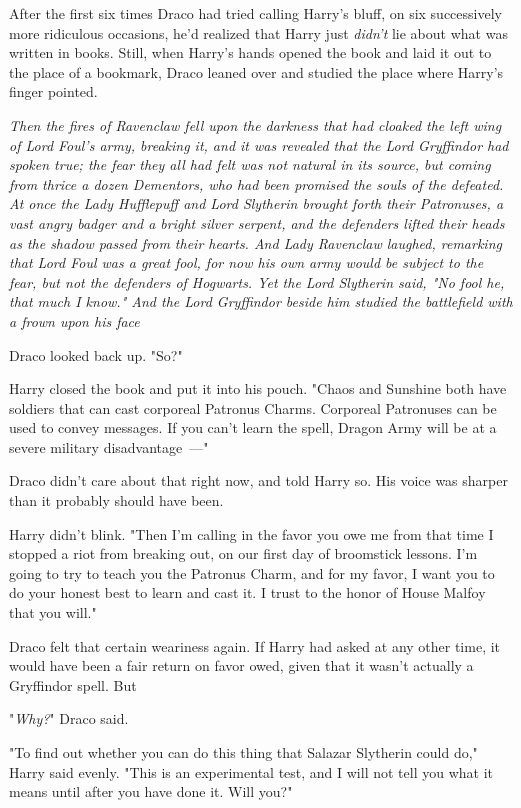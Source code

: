 After the first six times Draco had tried calling Harry's bluff, on six
successively more ridiculous occasions, he'd realized that Harry just
\emph{didn't} lie about what was written in books. Still, when Harry's hands
opened the book and laid it out to the place of a bookmark, Draco leaned over
and studied the place where Harry's finger pointed.

\emph{Then the fires of Ravenclaw fell upon the darkness that had cloaked the
left wing of Lord Foul's army, breaking it, and it was revealed that the Lord
Gryffindor had spoken true; the fear they all had felt was not natural in its
source, but coming from thrice a dozen Dementors, who had been promised the
souls of the defeated. At once the Lady Hufflepuff and Lord Slytherin brought
forth their Patronuses, a vast angry badger and a bright silver serpent, and
the defenders lifted their heads as the shadow passed from their hearts. And
Lady Ravenclaw laughed, remarking that Lord Foul was a great fool, for now his
own army would be subject to the fear, but not the defenders of Hogwarts. Yet
the Lord Slytherin said, "No fool he, that much I know." And the Lord
Gryffindor beside him studied the battlefield with a frown upon his
face{\el}}

Draco looked back up. "So?"

Harry closed the book and put it into his pouch. "Chaos and Sunshine both have
soldiers that can cast corporeal Patronus Charms. Corporeal Patronuses can be
used to convey messages. If you can't learn the spell, Dragon Army will be at a
severe military disadvantage~---"

Draco didn't care about that right now, and told Harry so. His voice was
sharper than it probably should have been.

Harry didn't blink. "Then I'm calling in the favor you owe me from that time I
stopped a riot from breaking out, on our first day of broomstick lessons. I'm
going to try to teach you the Patronus Charm, and for my favor, I want you to
do your honest best to learn and cast it. I trust to the honor of House Malfoy
that you will."

Draco felt that certain weariness again. If Harry had asked at any other time,
it would have been a fair return on favor owed, given that it wasn't actually a
Gryffindor spell. But{\el}

"\emph{Why?}" Draco said.

"To find out whether you can do this thing that Salazar Slytherin could do,"
Harry said evenly. "This is an experimental test, and I will not tell you what
it means until after you have done it. Will you?"

